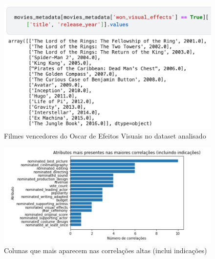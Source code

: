             \begin{figure}[htb]
            	\caption{\label{vencedores_efeitos}Filmes vencedores do Oscar de Efeitos Visuais no dataset analisado}
            	\begin{center}
            		\includegraphics[scale=0.7]{vencedores_efeitos.png}
            	\end{center}
            \end{figure}

            \begin{figure}[htb]
            	\caption{\label{colunas_influentes_1}Colunas que mais aparecem nas correlações altas (inclui indicações)}
            	\begin{center}
            		\includegraphics[scale=0.7]{colunas_influentes_1.png}
            	\end{center}
            \end{figure}

